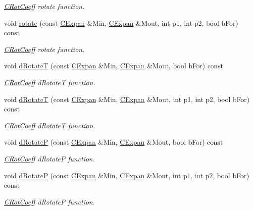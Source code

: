 \begin{DoxyCompactItemize}
\begin{DoxyCompactList}\small\item\em \hyperlink{classCRotCoeff}{C\-Rot\-Coeff} rotate function. \end{DoxyCompactList}\item 
void \hyperlink{classCRotCoeff_a7e40be29cfa7e68bed6ed6c536d0a63d}{rotate} (const \hyperlink{classCExpan}{C\-Expan} \&Min, \hyperlink{classCExpan}{C\-Expan} \&Mout, int p1, int p2, bool b\-For) const 
\begin{DoxyCompactList}\small\item\em \hyperlink{classCRotCoeff}{C\-Rot\-Coeff} rotate function. \end{DoxyCompactList}\item 
void \hyperlink{classCRotCoeff_ae3eb09daf8ec42fd14f94e027f14bbbc}{d\-Rotate\-T} (const \hyperlink{classCExpan}{C\-Expan} \&Min, \hyperlink{classCExpan}{C\-Expan} \&Mout, bool b\-For) const 
\begin{DoxyCompactList}\small\item\em \hyperlink{classCRotCoeff}{C\-Rot\-Coeff} d\-Rotate\-T function. \end{DoxyCompactList}\item 
void \hyperlink{classCRotCoeff_a888c0b53003ee5da4684bf066ed9469f}{d\-Rotate\-T} (const \hyperlink{classCExpan}{C\-Expan} \&Min, \hyperlink{classCExpan}{C\-Expan} \&Mout, int p1, int p2, bool b\-For) const 
\begin{DoxyCompactList}\small\item\em \hyperlink{classCRotCoeff}{C\-Rot\-Coeff} d\-Rotate\-T function. \end{DoxyCompactList}\item 
void \hyperlink{classCRotCoeff_a80e8ee93f78a14024e2d22e229ba5db9}{d\-Rotate\-P} (const \hyperlink{classCExpan}{C\-Expan} \&Min, \hyperlink{classCExpan}{C\-Expan} \&Mout, bool b\-For) const 
\begin{DoxyCompactList}\small\item\em \hyperlink{classCRotCoeff}{C\-Rot\-Coeff} d\-Rotate\-P function. \end{DoxyCompactList}\item 
void \hyperlink{classCRotCoeff_a284a25380e0a1544b64ab337e019f0c2}{d\-Rotate\-P} (const \hyperlink{classCExpan}{C\-Expan} \&Min, \hyperlink{classCExpan}{C\-Expan} \&Mout, int p1, int p2, bool b\-For) const 
\begin{DoxyCompactList}\small\item\em \hyperlink{classCRotCoeff}{C\-Rot\-Coeff} d\-Rotate\-P function. \end{DoxyCompactList}\item 

\end{DoxyCompactItemize}
